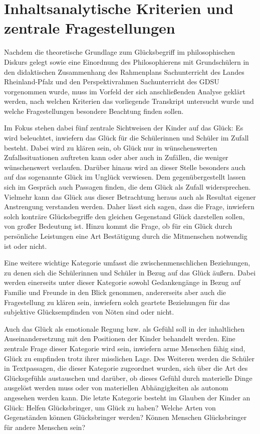 \section{Inhaltsanalytische Kriterien und zentrale Fragestellungen}

Nachdem die theoretische Grundlage zum Glücksbegriff im philosophischen Diskurs gelegt sowie eine Einordnung des Philosophierens mit Grundschülern in den didaktischen Zusammenhang des Rahmenplans Sachunterricht des Landes Rheinland-Pfalz und den Perspektivrahmen Sachunterricht des GDSU vorgenommen wurde, muss im Vorfeld der sich anschließenden Analyse geklärt werden, nach welchen Kriterien das vorliegende Transkript untersucht wurde und welche Fragestellungen besondere Beachtung finden sollen.

Im Fokus stehen dabei fünf zentrale Sichtweisen der Kinder auf das Glück: 
Es wird beleuchtet, inwiefern das Glück für die Schülerinnen und Schüler im Zufall besteht. 
Dabei wird zu klären sein, ob Glück nur in wünschenswerten Zufallssituationen auftreten kann oder aber auch in Zufällen, die weniger wünschenswert verlaufen. 
Darüber hinaus wird an dieser Stelle besonders auch auf das sogenannte \glqq Glück im Unglück\grqq{} verwiesen. 
Dem gegenübergestellt lassen sich im Gespräch auch Passagen finden, die dem Glück als Zufall widersprechen. 
Vielmehr kann das Glück aus dieser Betrachtung heraus auch als Resultat eigener Anstrengung verstanden werden.
Daher lässt sich sagen, dass die Frage, inwiefern solch konträre Glücksbegriffe den gleichen Gegenstand \glqq Glück\grqq{} darstellen sollen, von großer Bedeutung ist. 
Hinzu kommt die Frage, ob für ein Glück durch persönliche Leistungen eine Art Bestätigung durch die Mitmenschen notwendig ist oder nicht.

Eine weitere wichtige Kategorie umfasst die zwischenmenschlichen Beziehungen, zu denen sich die Schülerinnen und Schüler in Bezug auf das Glück äußern. 
Dabei werden einerseits unter dieser Kategorie sowohl Gedankengänge in Bezug auf Familie und Freunde in den Blick genommen, andererseits aber auch die Fragestellung zu klären sein, inwiefern solch geartete Beziehungen für das subjektive Glücksempfinden von Nöten sind oder nicht. 

Auch das Glück als emotionale Regung bzw. als Gefühl soll in der inhaltlichen Auseinandersetzung mit den Positionen der Kinder behandelt werden. 
Eine zentrale Frage dieser Kategorie wird sein, inwiefern arme Menschen fähig sind, Glück zu empfinden trotz ihrer misslichen Lage. 
Des Weiteren werden die Schüler in Textpassagen, die dieser Kategorie zugeordnet wurden, sich über die Art des Glücksgefühls austauschen und darüber, ob dieses Gefühl durch materielle Dinge ausgelöst werden muss oder von materiellen Abhängigkeiten als autonom angesehen werden kann. 
Die letzte Kategorie besteht im Glauben der Kinder an Glück: 
Helfen Glücksbringer, um Glück zu haben? Welche Arten von Gegenständen können Glücksbringer werden? 
Können Menschen Glücksbringer für andere Menschen sein?

